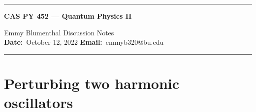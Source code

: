 \documentclass[10pt]{article}
\newcommand{\1}{\mathbf 1}
\begin{document}
\begin{center}
	\hrule
	\vspace{.4cm}
	{\textbf { \large CAS PY 452 --- Quantum Physics II}}
\end{center}
 Emmy Blumenthal \hspace{\fill} \hspace{\fill}  \textbf{} Discussion Notes\  \\
\textbf{Date:}\  October 12, 2022   \hspace{\fill} \textbf{Email:}\ emmyb320@bu.edu

\vspace{.4cm}
\hrule

\section*{Perturbing two harmonic oscillators}




\end{document}
